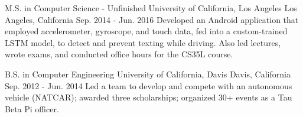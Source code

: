 

\begin{cventries}

  \cventry
    {M.S. in Computer Science - Unfinished} %
    {University of California, Los Angeles} %
    {Los Angeles, California} %
    {Sep. 2014 - Jun. 2016} %
    {Developed an Android application that employed accelerometer, gyroscope, and touch data, fed into a custom-trained LSTM model, to detect and prevent texting while driving. Also led lectures, wrote exams, and conducted office hours for the CS35L course.} %
    {}

  \cventry
    {B.S. in Computer Engineering} %
    {University of California, Davis} %
    {Davis, California} %
    {Sep. 2012 - Jun. 2014} %
    {Led a team to develop and compete with an autonomous vehicle (NATCAR); awarded three scholarships; organized 30+ events as a Tau Beta Pi officer.}
    {}

\end{cventries}
